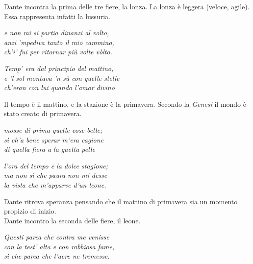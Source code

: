 \documentclass[a4paper]{article}
\begin{document}
Dante incontra la prima delle tre fiere, la lonza.
La lonza è leggera (veloce, agile). Essa rappresenta infatti la lussuria.

\begin{center}
    \textit{e non mi si partia dinanzi al volto,} \\
    \textit{anzi 'mpediva tanto il mio cammino,} \\
    \textit{ch'i' fui per ritornar più volte vòlto.}
\end{center}

\begin{center}
    \textit{Temp' era dal principio del mattino,} \\
    \textit{e 'l sol montava 'n sù con quelle stelle} \\
    \textit{ch'eran con lui quando l'amor divino}
\end{center}

Il tempo è il mattino, e la stazione è la primavera.
Secondo la \textit{Genesi} il mondo è stato creato di primavera.

\begin{center}
    \textit{mosse di prima quelle cose belle;} \\
    \textit{sì ch'a bene sperar m'era cagione} \\
    \textit{di quella fiera a la gaetta pelle}
\end{center}

\begin{center}
    \textit{l'ora del tempo e la dolce stagione;} \\
    \textit{ma non sì che paura non mi desse} \\
    \textit{la vista che m'apparve d'un leone.}
\end{center}

Dante ritrova speranza pensando che il mattino di primavera sia un momento propizio di inizio.
\\
Dante incontro la seconda delle fiere, il leone.

\begin{center}
    \textit{Questi parea che contra me venisse} \\
    \textit{con la test' alta e con rabbiosa fame,} \\
    \textit{sì che parea che l'aere ne tremesse.}
\end{center}
\end{document}
